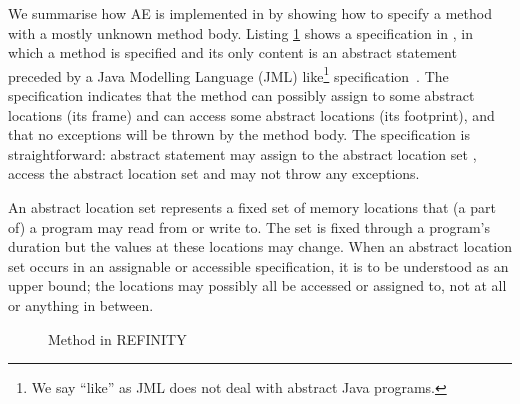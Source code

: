 We summarise how AE is implemented in \Refinity{} by showing how to specify a method  with a mostly unknown method body.
Listing \ref{lst:ExtractVariable-refinity-method} shows a specification in \Refinity{}, in which a method  is specified and its only content is an abstract statement  preceded by a Java Modelling Language (JML) like\footnote{We say ``like'' as JML does not deal with abstract Java programs.} specification~\cite{HuismanAhrendtBruns2014_1000041881}.
%
The specification indicates that the method can possibly assign to some abstract locations (its frame) and can access some abstract locations (its footprint), and that no exceptions will be thrown by the method body.
The specification is straightforward: abstract statement  may assign to the abstract location set , access the abstract location set  and may not throw any exceptions.

An abstract location set represents a fixed set of memory locations that (a part of) a program may read from or write to.
The set is fixed through a program's duration but the values at these locations may change.
When an abstract location set occurs in an assignable or accessible specification, it is to be understood as an upper bound;
the locations may possibly all be accessed or assigned to, not at all or anything in between.

\begin{figure}[tbp]
  \centering
  \captionsetup{type=lstlisting}
  \begin{sublstlisting}{.65\linewidth}
  
  \end{sublstlisting}
  \caption{Method in REFINITY}
  \label{lst:ExtractVariable-refinity-method}
\end{figure}


